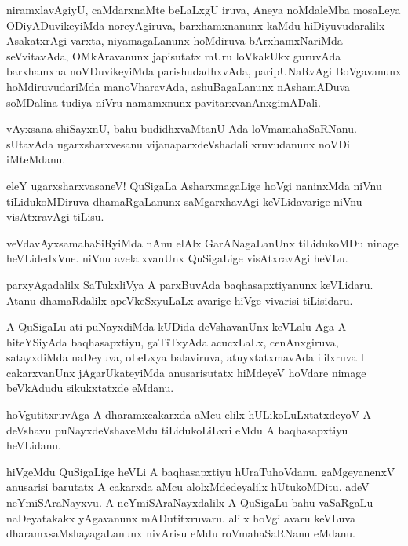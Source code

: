 \documentclass{article}
\begin{document}
\begin{mn}
niramxlavAgiyU, caMdarxnaMte beLaLxgU iruva, Aneya noMdaleMba mosaLeya
ODiyADuvikeyiMda noreyAgiruva, barxhamxnanunx kaMdu hiDiyuvudaralilx
AsakatxrAgi varxta, niyamagaLanunx hoMdiruva bArxhamxNariMda
seVvitavAda, OMkAravanunx japisutatx mUru loVkakUkx guruvAda
barxhamxna noVDuvikeyiMda parishudadhxvAda, paripUNaRvAgi BoVgavanunx
hoMdiruvudariMda manoVharavAda, ashuBagaLanunx nAshamADuva soMDalina
tudiya niVru namamxnunx pavitarxvanAnxgimADali.
\end{mn}

\begin{mn}
vAyxsana shiSayxnU, bahu budidhxvaMtanU Ada loVmamahaSaRNanu. sUtavAda
ugarxsharxvesanu vijanaparxdeVshadalilxruvudanunx noVDi iMteMdanu.
\end{mn}

\begin{mn}
eleY ugarxsharxvasaneV! QuSigaLa AsharxmagaLige hoVgi naninxMda niVnu
tiLidukoMDiruva dhamaRgaLanunx saMgarxhavAgi keVLidavarige niVnu
visAtxravAgi tiLisu.
\end{mn}

\begin{mn}
veVdavAyxsamahaSiRyiMda nAnu elAlx GarANagaLanUnx tiLidukoMDu ninage
heVLidedxVne. niVnu avelalxvanUnx QuSigaLige visAtxravAgi heVLu.
\end{mn}

\begin{mn}
parxyAgadalilx SaTukxliVya A parxBuvAda baqhasapxtiyanunx
keVLidaru. Atanu dhamaRdalilx apeVkeSxyuLaLx avarige hiVge vivarisi tiLisidaru.
\end{mn}

\begin{mn}
A QuSigaLu ati puNayxdiMda kUDida deVshavanUnx keVLalu Aga A
hiteYSiyAda baqhasapxtiyu, gaTiTxyAda acucxLaLx, cenAnxgiruva,
satayxdiMda naDeyuva, oLeLxya balaviruva, atuyxtatxmavAda ililxruva I
cakarxvanUnx jAgarUkateyiMda anusarisutatx hiMdeyeV hoVdare nimage
beVkAdudu sikukxtatxde eMdanu.
\end{mn}

\begin{mn}
hoVgutitxruvAga A dharamxcakarxda aMcu elilx hULikoLuLxtatxdeyoV A
deVshavu puNayxdeVshaveMdu tiLidukoLiLxri eMdu A baqhasapxtiyu heVLidanu.
\end{mn}

\begin{mn}
hiVgeMdu QuSigaLige heVLi A baqhasapxtiyu hUraTuhoVdanu. gaMgeyanenxV
anusarisi barutatx A cakarxda aMcu alolxMdedeyalilx hUtukoMDitu. adeV
neYmiSAraNayxvu. A neYmiSAraNayxdalilx A QuSigaLu bahu vaSaRgaLu
naDeyatakakx yAgavanunx mADutitxruvaru. alilx hoVgi avaru keVLuva
dharamxsaMshayagaLanunx nivArisu eMdu roVmahaSaRNanu eMdanu.
\end{mn}
\end{document}
